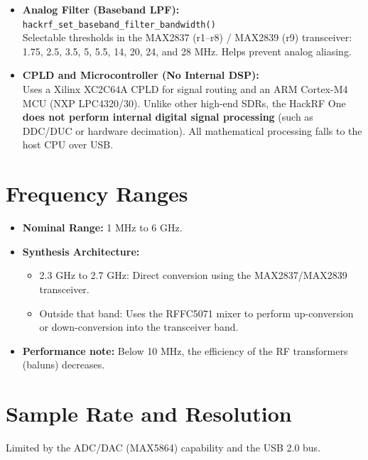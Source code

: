 \documentclass[11pt]{article}
\begin{document}
\begin{itemize}
    \item \textbf{Analog Filter (Baseband LPF):} \texttt{hackrf\_set\_baseband\_filter\_bandwidth()}\\
    Selectable thresholds in the MAX2837 (r1--r8) / MAX2839 (r9) transceiver: 1.75, 2.5, 3.5, 5, 5.5, 14, 20, 24, and 28 MHz. Helps prevent analog aliasing.
    \item \textbf{CPLD and Microcontroller (No Internal DSP):}\\
    Uses a Xilinx XC2C64A CPLD for signal routing and an ARM Cortex-M4 MCU (NXP LPC4320/30). Unlike other high-end SDRs, the HackRF One \textbf{does not perform internal digital signal processing} (such as DDC/DUC or hardware decimation). All mathematical processing falls to the host CPU over USB.
\end{itemize}

\section{Frequency Ranges}

\begin{itemize}
    \item \textbf{Nominal Range:} 1 MHz to 6 GHz.
    \item \textbf{Synthesis Architecture:}
    \begin{itemize}
        \item 2.3 GHz to 2.7 GHz: Direct conversion using the MAX2837/MAX2839 transceiver.
        \item Outside that band: Uses the RFFC5071 mixer to perform up-conversion or down-conversion into the transceiver band.
    \end{itemize}
    \item \textbf{Performance note:} Below 10 MHz, the efficiency of the RF transformers (baluns) decreases.
\end{itemize}

\section{Sample Rate and Resolution}

Limited by the ADC/DAC (MAX5864) capability and the USB 2.0 bus.
\end{document}
